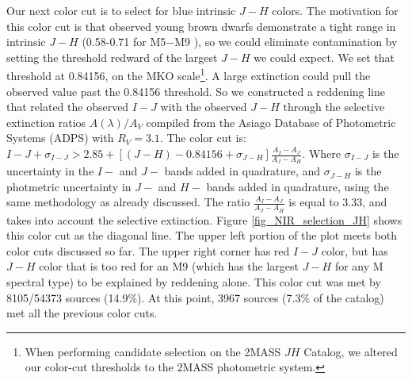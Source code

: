 Our next color cut is to select for blue intrinsic $J-H$ colors.  The motivation for this color cut is that observed young brown dwarfs demonstrate a tight range in intrinsic $J-H$ (0.58-0.71 for M5$-$M9 \citep{2010ApJS..186..111L}), so we could eliminate contamination by setting the threshold redward of the largest $J-H$ we could expect.  We set that threshold at 0.84156, on the MKO scale\footnote{When performing candidate selection on the 2MASS $JH$ Catalog, we altered our color-cut thresholds to the 2MASS photometric system.}.  A large extinction could pull the observed value past the 0.84156 threshold.  So we constructed a reddening line that related the observed $I-J$ with the observed $J-H$ through the selective extinction ratios $A(\lambda)/A_V$ compiled from the Asiago Database of Photometric Systems (ADPS) \citep{2000A&AS..147..361M} with $R_V=3.1$.  The color cut is: $I-J + \sigma_{I-J} > 2.85 + [(J-H) - 0.84156 + \sigma_{J-H}]\frac{A_I-A_J}{A_J - A_H}$.  Where $\sigma_{I-J}$ is the uncertainty in the $I-$ and $J-$ bands added in quadrature, and $\sigma_{J-H}$ is the photmetric uncertainty in $J-$ and $H-$ bands added in quadrature, using the same methodology as already discussed.  The ratio $\frac{A_I-A_J}{A_J - A_H}$ is equal to 3.33, and takes into account the selective extinction.  Figure \ref{fig_NIR_selection_JH} shows this color cut as the diagonal line.  The upper left portion of the plot meets both color cuts discussed so far.  The upper right corner has red $I-J$ color, but has $J-H$ color that is too red for an M9 (which has the largest $J-H$ for any M spectral type) to be explained by reddening alone.  This color cut was met by 8105/54373 sources (14.9\%).  At this point, 3967 sources (7.3\% of the catalog) met all the previous color cuts.

